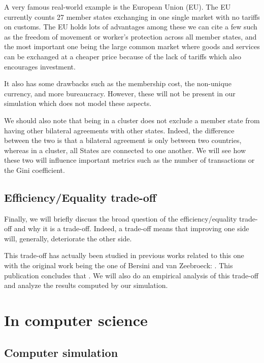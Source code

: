     A very famous real-world example is the European Union (EU). The EU currently counts 27 member states exchanging in one single market with no tariffs on customs. The EU holds lots of advantages among these we can cite a few such as the freedom of movement or worker's protection across all member states, and the most important one being the large common market where goods and services can be exchanged at a cheaper price because of the lack of tariffs which also encourages investment.
    
    It also has some drawbacks such as the membership cost, the non-unique currency, and more bureaucracy. However, these will not be present in our simulation which does not model these aspects.
    
    We should also note that being in a cluster does not exclude a member state from having other bilateral agreements with other states. Indeed, the difference between the two is that a bilateral agreement is only between two countries, whereas in a cluster, all States are connected to one another. We will see how these two will influence important metrics such as the number of transactions or the Gini coefficient.

\subsection{Efficiency/Equality trade-off}
    Finally, we will briefly discuss the broad question of the efficiency/equality trade-off and why it is a trade-off. Indeed, a trade-off means that improving one side will, generally, deteriorate the other side.
    
    This trade-off has actually been studied in previous works related to this one with the original work being the one of Bersini and van Zeebroeck: . This publication concludes that  \cite{bersini}. We will also do an empirical analysis of this trade-off and analyze the results computed by our simulation.
    

\section{In computer science}

    \subsection{Computer simulation}

